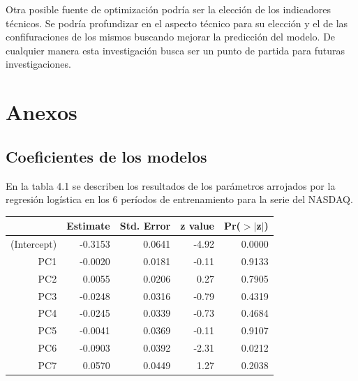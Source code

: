 \documentclass[a4paper,12pt]{Latex/Classes/PhDthesisPSnPDF}
\begin{document}
Otra posible fuente de optimización podría ser la elección de los indicadores técnicos. Se podría profundizar en el aspecto técnico para su elección y el de las confifuraciones de los mismos buscando mejorar la predicción del modelo. De cualquier manera esta investigación busca ser un punto de partida para futuras investigaciones.



\chapter{Anexos}

\section{Coeficientes de los modelos}

En la tabla 4.1 se describen los resultados de los parámetros arrojados por la regresión logística en los 6 períodos de entrenamiento para la serie del NASDAQ.
\begin{center}
\begin{table}[ht]
\centering
\begin{tabular}{rrrrr}
  \hline
 & Estimate & Std. Error & z value & Pr($>$$|$z$|$) \\ 
  \hline
(Intercept) & -0.3153 & 0.0641 & -4.92 & 0.0000 \\ 
  PC1 & -0.0020 & 0.0181 & -0.11 & 0.9133 \\ 
  PC2 & 0.0055 & 0.0206 & 0.27 & 0.7905 \\ 
  PC3 & -0.0248 & 0.0316 & -0.79 & 0.4319 \\ 
  PC4 & -0.0245 & 0.0339 & -0.73 & 0.4684 \\ 
  PC5 & -0.0041 & 0.0369 & -0.11 & 0.9107 \\ 
  PC6 & -0.0903 & 0.0392 & -2.31 & 0.0212 \\ 
  PC7 & 0.0570 & 0.0449 & 1.27 & 0.2038 \\ 
   \hline
\end{tabular}
\end{table}\end{center}
\end{document}
